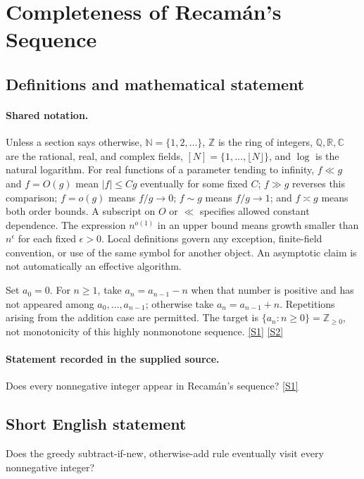 \documentclass[11pt,a4paper]{article}
\newcommand{\N}{\mathbb{N}}
\newcommand{\Z}{\mathbb{Z}}
\newcommand{\Q}{\mathbb{Q}}
\newcommand{\R}{\mathbb{R}}
\newcommand{\C}{\mathbb{C}}
\newcommand{\sref}[2]{\hyperlink{source:#1:#2}{[S#2]}}
\begin{document}
\section{Completeness of Recamán's Sequence}\label{statement}


\subsection{Definitions and mathematical statement}

\paragraph{Shared notation.}Unless a section says otherwise, $\N=\{1,2,\ldots\}$,
$\Z$ is the ring of integers, $\Q,\R,\C$ are the rational, real, and complex
fields, $[N]=\{1,\ldots,\lfloor N\rfloor\}$, and $\log$ is the natural
logarithm. For real functions of a parameter tending to infinity,
$f\ll g$ and $f=O(g)$ mean $|f|\leq Cg$ eventually for some fixed $C$;
$f\gg g$ reverses this comparison; $f=o(g)$ means $f/g\to0$;
$f\sim g$ means $f/g\to1$; and $f\asymp g$ means both order bounds.
A subscript on $O$ or $\ll$ specifies allowed constant dependence.
The expression $n^{o(1)}$ in an upper bound means growth smaller than
$n^\epsilon$ for each fixed $\epsilon>0$. Local definitions govern any
exception, finite-field convention, or use of the same symbol for another
object. An asymptotic claim is not automatically an effective algorithm.



Set $a_0=0$. For $n\geq1$, take $a_n=a_{n-1}-n$ when that number is positive and has not appeared among $a_0,\ldots,a_{n-1}$; otherwise take $a_n=a_{n-1}+n$. Repetitions arising from the addition case are permitted. The target is $\{a_n:n\geq0\}=\Z_{\geq0}$, not monotonicity of this highly nonmonotone sequence. \sref{statement}{1} \sref{statement}{2}

\paragraph{Statement recorded in the supplied source.}
Does every nonnegative integer appear in Recamán's sequence? \sref{statement}{1}

\subsection{Short English statement}

Does the greedy subtract-if-new, otherwise-add rule eventually visit every nonnegative integer?
\end{document}
